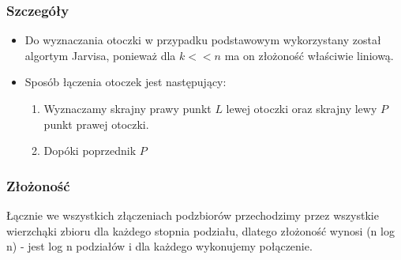 \documentclass[11pt]{article}
\theoremstyle{remark} \newtheorem{definition}{def.}
\theoremstyle{definition} \newtheorem{twierdzenie}{tw.}
\begin{document}
    \subsubsection{Szczegóły}

    \begin{itemize}
        \item   Do wyznaczania otoczki w przypadku podstawowym wykorzystany został algortym Jarvisa, ponieważ dla $k << n$ ma on złożoność właściwie liniową.
        \item   Sposób łączenia otoczek jest następujący: 
                \begin{enumerate}
                    \item  Wyznaczamy skrajny prawy punkt $L$ lewej otoczki oraz skrajny lewy $P$ punkt prawej otoczki. 
                    \item  Dopóki poprzednik $P$  
                \end{enumerate}
    \end{itemize}


    \subsubsection{Złożoność}
    Łącznie we wszystkich złączeniach podzbiorów przechodzimy przez wszystkie wierzchąki zbioru dla każdego stopnia
    podziału, dlatego złożoność wynosi (n log n) - jest log n podziałów i dla każdego wykonujemy połączenie.
\end{document}
